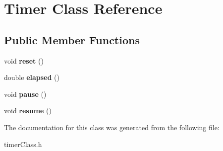 \hypertarget{class_timer}{}\section{Timer Class Reference}
\label{class_timer}
\subsection*{Public Member Functions}
\begin{DoxyCompactItemize}
\item 
\mbox{\label{class_timer_a9020542d73357a4eef512eefaf57524b}} 
void {\bfseries reset} ()
\item 
\mbox{\label{class_timer_a7a0f15257db9fa349a43042d3d28349b}} 
double {\bfseries elapsed} ()
\item 
\mbox{\label{class_timer_a0289effad7b573c508bc27e405900a23}} 
void {\bfseries pause} ()
\item 
\mbox{\label{class_timer_a4ac55a73bb3431db9d4d2fd70ae9a2e8}} 
void {\bfseries resume} ()
\end{DoxyCompactItemize}


The documentation for this class was generated from the following file\+:\begin{DoxyCompactItemize}
\item 
timer\+Class.\+h\end{DoxyCompactItemize}
